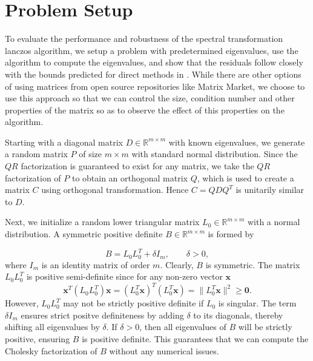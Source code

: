 \section{Problem Setup}\label{sec:ProblemSetup}

To evaluate the performance and robustness of the spectral transformation lanczos algorithm, we setup a problem with predetermined eigenvalues, use the algorithm to compute the eigenvalues, and show that the residuals follow closely with the bounds predicted for direct methods in \cite{stewart2024spectraltransformationdensesymmetric}. While there are other options of using matrices from open source repositories like Matrix Market, we choose to use this approach so that we can control the size, condition number and other properties of the matrix so as to observe the effect of this properties on the algorithm.

Starting with a diagonal matrix $D \in \mathbb{R}^{m \times m}$ with known eigenvalues, we generate a random matrix $P$ of size $m \times m $ with standard normal distribution. Since the $QR$ factorization is guaranteed to exist for any matrix, we take the $QR$ factorization of $P$ to obtain an orthogonal matrix $Q$, which is used to create a matrix $C$ using orthogonal transformation. Hence $C = QDQ^T$ is unitarily similar to $D$.

Next, we initialize a random lower triangular matrix $L_0 \in \mathbb{R}^{m \times m}$ with a normal distribution. A symmetric positive definite $B \in \mathbb{R}^{m \times m}$ is formed by

\begin{equation}\label{eq:FormingB}
	B = L_0 L_0^T + \delta I_m, \qquad \delta > 0,
\end{equation}
where $I_m$ is an identity matrix of order $m$. Clearly, $B$ is symmetric. The matrix $L_0L_0^T$ is positive semi-definite since for any non-zero vector $\mathbf{x}$
\begin{equation}
	\mathbf{x}^T(L_0L_0^T)\mathbf{x} = (L_0^T\mathbf{x})^T(L_0^T\mathbf{x}) = \| L_0^T\mathbf{x} \|^2 \geq \mathbf{0}.
\end{equation}
However, $L_0L_0^T$ may not be strictly positive definite if $L_0$ is singular. The term $\delta I_m$ ensures strict positve definiteness by adding $\delta$ to its diagonals, thereby shifting all eigenvalues by $\delta$. If $\delta > 0$, then all eigenvalues of $B$ will be strictly positive, ensuring $B$ is positive definite. This guarantees that we can compute the Cholesky factorization of $B$ without any numerical issues.

